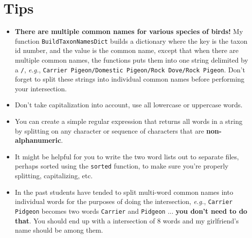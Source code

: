 \documentclass[11pt]{amsart}
\begin{document}
\section*{Tips}
\begin{itemize}
  \item \textbf{There are multiple common names for various species of birds!} My function \texttt{BuildTaxonNamesDict} builds a dictionary where the key is the taxon id number, and the value is the common name, except that when there are multiple common names, the functions puts them into one string delimited by a \texttt{/}, \textit{e.g.}, \texttt{Carrier Pigeon/Domestic Pigeon/Rock Dove/Rock Pigeon}. Don't forget to split these strings into individual common names before performing your intersection.
  \item Don't take capitalization into account, use all lowercase or uppercase words.
  \item You can create a simple regular expression that returns all words in a string by splitting on any character or sequence of characters that are \textbf{non-alphanumeric}.
  \item It might be helpful for you to write the two word lists out to separate files, perhaps sorted using the \texttt{sorted} function, to make sure you're properly splitting, capitalizing, etc.
  \item In the past students have tended to split multi-word common names into individual words for the purposes of doing the intersection, \textit{e.g.}, \texttt{Carrier Pidgeon} becomes two words \texttt{Carrier} and \texttt{Pidgeon} ... \textbf{you don't need to do that}. You should end up with a intersection of 8 words and my girlfriend's name should be among them.
\end{itemize}
\end{document}
